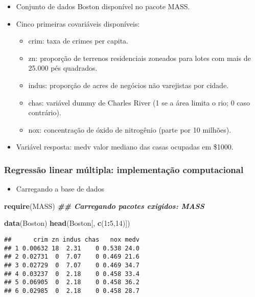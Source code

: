 \documentclass[
]{article}
\newenvironment{Shaded}{\begin{snugshade}}{\end{snugshade}}
\newcommand{\DecValTok}[1]{\textcolor[rgb]{0.00,0.00,0.81}{#1}}
\newcommand{\DocumentationTok}[1]{\textcolor[rgb]{0.56,0.35,0.01}{\textbf{\textit{#1}}}}
\newcommand{\FunctionTok}[1]{\textcolor[rgb]{0.13,0.29,0.53}{\textbf{#1}}}
\newcommand{\NormalTok}[1]{#1}
\newcommand{\SpecialCharTok}[1]{\textcolor[rgb]{0.81,0.36,0.00}{\textbf{#1}}}
\providecommand{\tightlist}{%
  \setlength{\itemsep}{0pt}\setlength{\parskip}{0pt}}
\begin{document}
\begin{itemize}
\tightlist
\item
  Conjunto de dados Boston disponível no pacote MASS.
\item
  Cinco primeiras covariáveis disponíveis:

  \begin{itemize}
  \tightlist
  \item
    crim: taxa de crimes per capita.
  \item
    zn: proporção de terrenos residenciais zoneados para lotes com mais
    de 25.000 pés quadrados.
  \item
    indus: proporção de acres de negócios não varejistas por cidade.
  \item
    chas: variável dummy de Charles River (1 se a área limita o rio; 0
    caso contrário).
  \item
    nox: concentração de óxido de nitrogênio (parte por 10 milhões).
  \end{itemize}
\item
  Variável resposta: medv valor mediano das casas ocupadas em \$1000.
\end{itemize}

\hypertarget{regressuxe3o-linear-muxfaltipla-implementauxe7uxe3o-computacional}{%
\subsubsection{Regressão linear múltipla: implementação
computacional}\label{regressuxe3o-linear-muxfaltipla-implementauxe7uxe3o-computacional}}

\begin{itemize}
\tightlist
\item
  Carregando a base de dados
\end{itemize}

\begin{Shaded}
\begin{Highlighting}[]
\FunctionTok{require}\NormalTok{(MASS)}
\DocumentationTok{\#\# Carregando pacotes exigidos: MASS}

\FunctionTok{data}\NormalTok{(Boston)}
\FunctionTok{head}\NormalTok{(Boston[, }\FunctionTok{c}\NormalTok{(}\DecValTok{1}\SpecialCharTok{:}\DecValTok{5}\NormalTok{,}\DecValTok{14}\NormalTok{)])}
\end{Highlighting}
\end{Shaded}

\begin{verbatim}
##      crim zn indus chas   nox medv
## 1 0.00632 18  2.31    0 0.538 24.0
## 2 0.02731  0  7.07    0 0.469 21.6
## 3 0.02729  0  7.07    0 0.469 34.7
## 4 0.03237  0  2.18    0 0.458 33.4
## 5 0.06905  0  2.18    0 0.458 36.2
## 6 0.02985  0  2.18    0 0.458 28.7
\end{verbatim}
\end{document}

